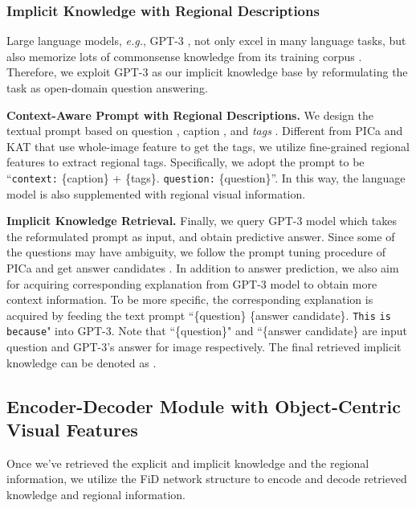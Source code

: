 \documentclass{article}
\begin{document}
\subsubsection{Implicit Knowledge with Regional Descriptions}
Large language models, \textit{e.g.}, GPT-3 \cite{brown2020language}, not only excel in many language tasks, but also memorize lots of commonsense knowledge from its training corpus \cite{yang2021empirical}. Therefore, we exploit GPT-3 \cite{brown2020language} as our implicit knowledge base by reformulating the task as open-domain question answering.

\textbf{Context-Aware Prompt with Regional Descriptions. }  We design the textual prompt based on question , caption , and \emph{tags} . Different from PICa \cite{yang2021empirical} and KAT \cite{gui2021kat} that use whole-image feature to get the tags, we utilize fine-grained regional features to extract regional tags. Specifically, we adopt the prompt  to be ``\texttt{context:} \{caption\} + \{tags\}. \texttt{question:} \{question\}''. In this way, the language model is also supplemented with regional visual information.


\textbf{Implicit Knowledge Retrieval. } Finally, we query GPT-3 model \cite{brown2020language} which takes the reformulated prompt  as input, and obtain predictive answer. Since some of the questions may have ambiguity, we follow the prompt tuning procedure of PICa \cite{yang2021empirical} and get answer candidates . In addition to answer prediction, we also aim for acquiring corresponding explanation  from GPT-3 model to obtain more context information. To be more specific, the corresponding explanation is acquired by feeding the text prompt ``\{question\} \{answer candidate\}. \texttt{This} \texttt{is} \texttt{because}" into GPT-3. Note that ``\{question\}" and ``\{answer candidate\} are input question  and GPT-3's  answer  for image  respectively. The final retrieved implicit knowledge can be denoted as . 

\subsection{Encoder-Decoder Module with Object-Centric Visual Features}
\label{fusion_module}

Once we've retrieved the explicit and implicit knowledge and the regional information, we utilize the FiD network structure \cite{izacard2020leveraging} to encode and decode retrieved knowledge and regional information.
\end{document}
